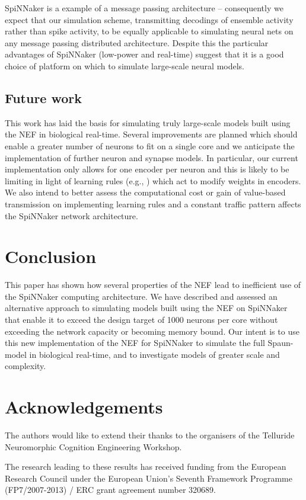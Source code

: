 \documentclass[conference]{IEEEtran}
\begin{document}
  SpiNNaker is a example of a message passing architecture -- consequently we expect that our simulation scheme, transmitting decodings of ensemble activity rather than spike activity, to be equally applicable to simulating neural nets on any message passing distributed architecture.
  Despite this the particular advantages of SpiNNaker (low-power and real-time) suggest that it is a good choice of platform on which to simulate large-scale neural models.

  \subsection{Future work}

  This work has laid the basis for simulating truly large-scale models built using the NEF in biological real-time.
  Several improvements are planned which should enable a greater number of neurons to fit on a single core and we anticipate the implementation of further neuron and synapse models.
  In particular, our current implementation only allows for one encoder per neuron and this is likely to be limiting in light of learning rules (e.g., \parencite{Voelker2014}) which act to modify weights in encoders.
  We also intend to better assess the computational cost or gain of value-based transmission on implementing learning rules and a constant traffic pattern affects the SpiNNaker network architecture.

  \section{Conclusion}

  This paper has shown how several properties of the NEF lead to inefficient use of the SpiNNaker computing architecture.
  We have described and assessed an alternative approach to simulating models built using the NEF on SpiNNaker that enable it to exceed the design target of 1000 neurons per core without exceeding the network capacity or becoming memory bound.
  Our intent is to use this new implementation of the NEF for SpiNNaker to simulate the full Spaun-model in biological real-time, and to investigate models of greater scale and complexity.

  \section*{Acknowledgements}

The authors would like to extend their thanks to the organisers of the Telluride Neuromorphic Cognition Engineering Workshop.

The research leading to these results has received funding from the European Research Council under the European Union’s Seventh Framework Programme (FP7/2007-2013) / ERC grant agreement number 320689.

  \printbibliography
\end{document}

